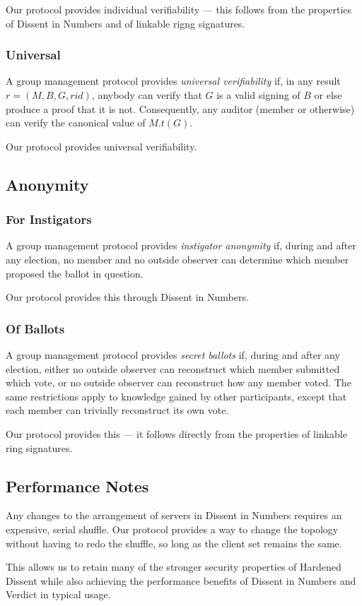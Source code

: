     Our protocol provides individual verifiability --- this follows from the
    properties of Dissent in Numbers and of linkable rigng signatures.%
    \subsubsection{Universal}
    A group management protocol provides \emph{universal verifiability} if, in
    any result $r = (M, B, G, rid)$, anybody can verify that $G$ is a valid
    signing of $B$ or else produce a proof that it is not. Consequently, any
    auditor (member or otherwise) can verify the canonical value of $M.t(G)$.

    Our protocol provides universal verifiability.%
  \subsection{Anonymity}
    \subsubsection{For Instigators}
    A group management protocol provides \emph{instigator anonymity} if, during
    and after any election, no member and no outside observer can determine
    which member proposed the ballot in question.

    Our protocol provides this through Dissent in Numbers.
    \subsubsection{Of Ballots}
    A group management protocol provides \emph{secret ballots} if, during and
    after any election, either no outside observer can reconstruct which member
    submitted which vote, or no outside observer can reconstruct how any
    member voted. The same restrictions apply to knowledge gained by other
    participants, except that each member can trivially reconstruct its own vote.

    Our protocol provides this --- it follows directly from the properties of
    linkable ring signatures.
\subsection{Performance Notes}
Any changes to the arrangement of servers in Dissent in Numbers requires an
expensive, serial shuffle. Our protocol provides a way to change the topology
without having to redo the shuffle, so long as the client set remains the same.

This allows us to retain many of the stronger security properties of Hardened
Dissent\cite{sec} while also achieving the performance benefits
of Dissent in Numbers and Verdict in typical usage.
